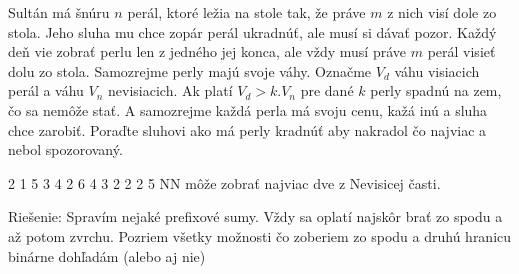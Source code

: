 
Sultán má šnúru $n$ perál, ktoré ležia
na stole tak, že práve $m$ z nich visí dole
zo stola. Jeho sluha mu chce zopár perál ukradnúť,
ale musí si dávať pozor. Každý deň vie zobrať perlu
len z jedného jej konca, ale vždy musí práve $m$
perál visieť dolu zo stola. Samozrejme perly majú
svoje váhy. Označme $V_d$ váhu visiacich perál
a váhu $V_n$ nevisiacich. Ak platí $V_d>k.V_n$ pre dané
$k$ perly spadnú na zem, čo sa nemôže stať.
A samozrejme každá perla má svoju cenu, kažá inú
a sluha chce zarobiť. Poraďte sluhovi ako má perly
kradnúť aby nakradol čo najviac a nebol spozorovaný.

 2 1
5 3
4 2
6 4
3 2
2 2
 5
NN
\komentar
môže zobrať najviac dve z Nevisicej časti.
\koniec

Riešenie: Spravím nejaké prefixové sumy. Vždy sa oplatí
najskôr brať zo spodu a až potom zvrchu. Pozriem všetky
možnosti čo zoberiem zo spodu a druhú hranicu binárne dohľadám
(alebo aj nie)
